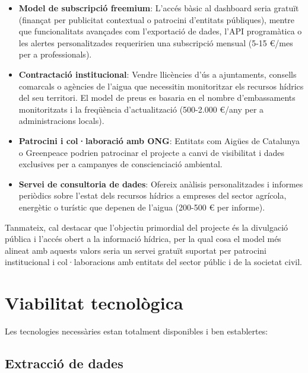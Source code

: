 \begin{itemize}
    \item \textbf{Model de subscripció freemium}: L'accés bàsic al dashboard seria gratuït (finançat per publicitat contextual o patrocini d'entitats públiques), mentre que funcionalitats avançades com l'exportació de dades, l'API programàtica o les alertes personalitzades requeririen una subscripció mensual (5-15 €/mes per a professionals).
    
    \item \textbf{Contractació institucional}: Vendre llicències d'ús a ajuntaments, consells comarcals o agències de l'aigua que necessitin monitoritzar els recursos hídrics del seu territori. El model de preus es basaria en el nombre d'embassaments monitoritzats i la freqüència d'actualització (500-2.000 €/any per a administracions locals).
    
    \item \textbf{Patrocini i col·laboració amb ONG}: Entitats com Aigües de Catalunya o Greenpeace podrien patrocinar el projecte a canvi de visibilitat i dades exclusives per a campanyes de conscienciació ambiental.
    
    \item \textbf{Servei de consultoria de dades}: Ofereix anàlisis personalitzades i informes periòdics sobre l'estat dels recursos hídrics a empreses del sector agrícola, energètic o turístic que depenen de l'aigua (200-500 € per informe).
\end{itemize}

Tanmateix, cal destacar que l'objectiu primordial del projecte és la divulgació pública i l'accés obert a la informació hídrica, per la qual cosa el model més alineat amb aquests valors seria un servei gratuït suportat per patrocini institucional i col·laboracions amb entitats del sector públic i de la societat civil.


\section{Viabilitat tecnològica}

Les tecnologies necessàries estan totalment disponibles i ben establertes:

\subsection{Extracció de dades}

